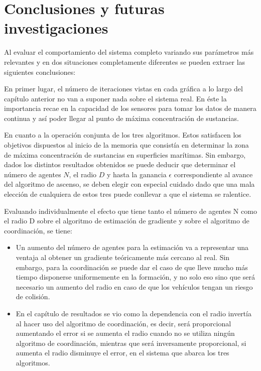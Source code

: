 
\chapter{Conclusiones y futuras investigaciones}
\label{ch:chapter4}

Al evaluar el comportamiento del sistema completo variando sus parámetros más relevantes y en dos situaciones completamente diferentes se pueden extraer las siguientes conclusiones:

En primer lugar, el número de iteraciones vistas en cada gráfica a lo largo del capítulo anterior no van a suponer nada sobre el sistema real. En éste la importancia recae en la capacidad de los sensores para tomar los datos de manera continua y así poder llegar al punto de máxima concentración de sustancias.

En cuanto a la operación conjunta de los tres algoritmos. Estos satisfacen los objetivos dispuestos al inicio de la memoria que consistía en determinar la zona de máxima concentración de sustancias en superficies marítimas. Sin embargo, dados los distintos resultados obtenidos se puede deducir que determinar el número de agentes $N$, el radio $D$ y hasta la ganancia $\epsilon$ correspondiente al avance del algoritmo de ascenso, se deben elegir con especial cuidado dado que una mala elección de cualquiera de estos tres puede conllevar a que el sistema se ralentice.

Evaluando individualmente el efecto que tiene tanto el número de agentes N como el radio D sobre el algoritmo de estimación de gradiente y sobre el algoritmo de coordinación, se tiene:

\begin{itemize}
	\item Un aumento del número de agentes para la estimación va a representar una ventaja al obtener un gradiente teóricamente más cercano al real. Sin embargo, para la coordinación se puede dar el caso de que lleve mucho más tiempo disponerse uniformemente en la formación, y no solo eso sino que será necesario un aumento del radio en caso de que los vehículos tengan un riesgo de colisión.
	\item En el capítulo de resultados se vio como la dependencia con el radio invertía al hacer uso del algoritmo de coordinación, es decir, será proporcional aumentando el error si se aumenta el radio cuando no se utiliza ningún algoritmo de coordinación, mientras que será inversamente proporcional, si aumenta el radio disminuye el error, en el sistema que abarca los tres algoritmos.
\end{itemize} 

